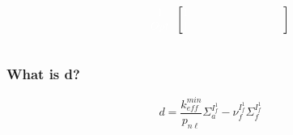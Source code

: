 \documentclass{beamer}
\def\w{\color{white}}
\begin{document}
\begin{frame}[shrink=25]
\begin{equation*}
\begin{blockarray}{cccccccccc}
\begin{block}{cc[cccccccc]}
                               & \w 1              & \w 1              &
                               &                   &                   &
             \\
                               & \w Opt            & \w 1              &
                               &                   &                   &
                               &                   &                   &
             \\
            \end{block}
        \end{blockarray}
    \end{equation*}

\end{frame}

\begin{frame}
\frametitle{What is d?}

    \begin{equation}
        d = \frac{k_{eff}^{min}}{p_{n\ell}} \Sigma_{a}^{I_{f}^{1}} - 
            \nu_{f}^{I_{f}^{1}} \Sigma_{f}^{I_{f}^{1}}
    \end{equation}

\end{frame}
\end{document}
